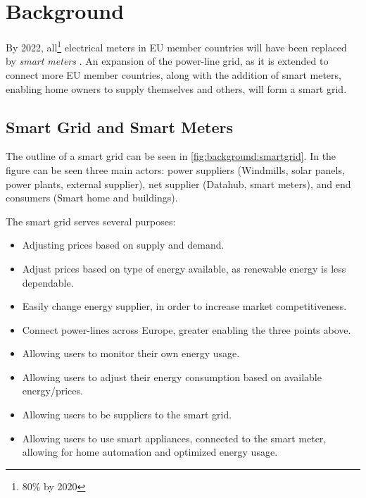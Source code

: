 \section{Background}
By 2022, all\footnote{80\% by 2020} electrical meters in EU member countries will have been replaced by \textit{smart meters} \cite{smart_meter_survey} \cite{directive_2009_72_EC}.
An expansion of the power-line grid, as it is extended to connect more EU member countries, along with the addition of smart meters, enabling home owners to supply themselves and others, will form a smart grid.

\subsection{Smart Grid and Smart Meters}
The outline of a smart grid can be seen in \cref{fig:background:smartgrid}.
In the figure can be seen three main actors: power suppliers (Windmills, solar panels, power plants, external supplier), net supplier (Datahub, smart meters), and end consumers (Smart home and buildings).

The smart grid serves several purposes:
\begin{itemize}
	\item Adjusting prices based on supply and demand.
	\item Adjust prices based on type of energy available, as renewable energy is less dependable.
	\item Easily change energy supplier, in order to increase market competitiveness.
	\item Connect power-lines across Europe, greater enabling the three points above.
	\item Allowing users to monitor their own energy usage.
	\item Allowing users to adjust their energy consumption based on available energy/prices.
	\item Allowing users to be suppliers to the smart grid.
	\item Allowing users to use smart appliances, connected to the smart meter, allowing for home automation and optimized energy usage.
\end{itemize}

